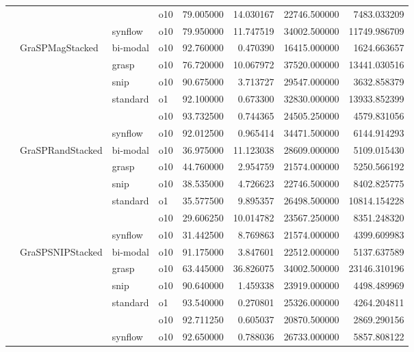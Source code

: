 \begin{longtable}{llllrrrr}
      &     &         & o10 &  79.005000 &  14.030167 &     22746.500000 &   7483.033209 \\
      &     & synflow & o10 &  79.950000 &  11.747519 &     34002.500000 &  11749.986709 \\
      & GraSPMagStacked & bi-modal & o10 &  92.760000 &   0.470390 &     16415.000000 &   1624.663657 \\
      &     & grasp & o10 &  76.720000 &  10.067972 &     37520.000000 &  13441.030516 \\
      &     & snip & o10 &  90.675000 &   3.713727 &     29547.000000 &   3632.858379 \\
      &     & standard & o1 &  92.100000 &   0.673300 &     32830.000000 &  13933.852399 \\
      &     &         & o10 &  93.732500 &   0.744365 &     24505.250000 &   4579.831056 \\
      &     & synflow & o10 &  92.012500 &   0.965414 &     34471.500000 &   6144.914293 \\
      & GraSPRandStacked & bi-modal & o10 &  36.975000 &  11.123038 &     28609.000000 &   5109.015430 \\
      &     & grasp & o10 &  44.760000 &   2.954759 &     21574.000000 &   5250.566192 \\
      &     & snip & o10 &  38.535000 &   4.726623 &     22746.500000 &   8402.825775 \\
      &     & standard & o1 &  35.577500 &   9.895357 &     26498.500000 &  10814.154228 \\
      &     &         & o10 &  29.606250 &  10.014782 &     23567.250000 &   8351.248320 \\
      &     & synflow & o10 &  31.442500 &   8.769863 &     21574.000000 &   4399.609983 \\
      & GraSPSNIPStacked & bi-modal & o10 &  91.175000 &   3.847601 &     22512.000000 &   5137.637589 \\
      &     & grasp & o10 &  63.445000 &  36.826075 &     34002.500000 &  23146.310196 \\
      &     & snip & o10 &  90.640000 &   1.459338 &     23919.000000 &   4498.489969 \\
      &     & standard & o1 &  93.540000 &   0.270801 &     25326.000000 &   4264.204811 \\
      &     &         & o10 &  92.711250 &   0.605037 &     20870.500000 &   2869.290156 \\
      &     & synflow & o10 &  92.650000 &   0.788036 &     26733.000000 &   5857.808122 \\

\end{longtable}
